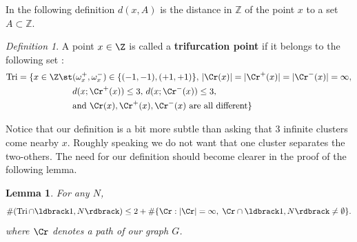 \documentclass[12pt]{amsart}
\DeclareMathOperator{\Tri}{Tri}
\newtheorem{lemma}{Lemma}
\theoremstyle{remark}
\newtheorem{definition}{Definition}
\newcommand{\Li}{\ldbrack} %
\newcommand{\Ri}{\rdbrack}
\begin{document}
In the following definition $d(x,A)$ is the distance in $ \mathbb{Z}$ of the point $x$ to a set $A \subset \mathbb{Z}$.
\begin{definition}A point $x\in\Z$ is called a \textbf{trifurcation point} if it belongs to the following set : 
\begin{align*}
 \Tri = \{x\in\Z \st 
 & (\omega^+_x,\omega^-_x)\in\{(-1,-1),(+1,+1)\},\,|\Cr(x)|=|\Cr^+(x)|=|\Cr^-(x)|=\infty,\\
 	& d(x;\Cr^+(x))\le3,\,d(x;\Cr^-(x))\le3,\\ 
	& \text{and } \Cr(x), \Cr^+(x), \Cr^-(x)\text{ are all different}\}
\end{align*}
\end{definition}
Notice that our definition is a bit more subtle than asking that $3$ infinite clusters come nearby $x$. Roughly speaking we do not want that one cluster separates the two-others. The need for our definition should become clearer in the proof of the following lemma.

\begin{lemma}\label{lem:trifurcation_point} For any $N$,
\[
\#(\Tri\cap\Li 1,N\Ri)\le 2+ \#\{\Cr:|\Cr|=\infty,\;\Cr\cap\Li 1,N\Ri\ne\emptyset\}.
\]
where $\Cr$ denotes a path of our graph $G$.

\end{lemma}
\end{document}
